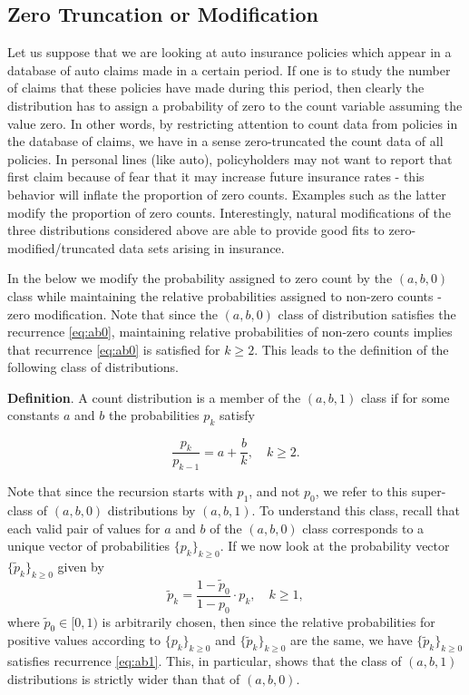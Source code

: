 \documentclass[]{book}
\theoremstyle{definition}
\theoremstyle{definition}
\theoremstyle{definition}
\theoremstyle{remark}
\begin{document}
\subsection{Zero Truncation or
Modification}\label{S:zero-truncation-or-modification}

Let us suppose that we are looking at auto insurance policies which
appear in a database of auto claims made in a certain period. If one is
to study the number of claims that these policies have made during this
period, then clearly the distribution has to assign a probability of
zero to the count variable assuming the value zero. In other words, by
restricting attention to count data from policies in the database of
claims, we have in a sense zero-truncated the count data of all
policies. In personal lines (like auto), policyholders may not want to
report that first claim because of fear that it may increase future
insurance rates - this behavior will inflate the proportion of zero
counts. Examples such as the latter modify the proportion of zero
counts. Interestingly, natural modifications of the three distributions
considered above are able to provide good fits to
zero-modified/truncated data sets arising in insurance.

In the below we modify the probability assigned to zero count by the
\((a,b,0)\) class while maintaining the relative probabilities assigned
to non-zero counts - zero modification. Note that since the \((a,b,0)\)
class of distribution satisfies the recurrence \eqref{eq:ab0}, maintaining
relative probabilities of non-zero counts implies that recurrence
\eqref{eq:ab0} is satisfied for \(k\geq 2\). This leads to the definition
of the following class of distributions.

\textbf{Definition}. A count distribution is a member of the
\((a, b, 1)\) class if for some constants \(a\) and \(b\) the
probabilities \(p_k\) satisfy

\begin{equation}
\frac{p_k}{p_{k-1}}=a+\frac{b}{k},\quad k\geq 2.
\label{eq:ab1}
\end{equation}

Note that since the recursion starts with \(p_1\), and not \(p_0\), we
refer to this super-class of \((a,b,0)\) distributions by \((a,b,1)\).
To understand this class, recall that each valid pair of values for
\(a\) and \(b\) of the \((a,b,0)\) class corresponds to a unique vector
of probabilities \(\{p_k\}_{k\geq 0}\). If we now look at the
probability vector \(\{\tilde{p}_k\}_{k\geq 0}\) given by \[
\tilde{p}_k= \frac{1-\tilde{p}_0}{1-p_0}\cdot p_k, \quad k\geq 1,
\] where \(\tilde{p}_0\in[0,1)\) is arbitrarily chosen, then since the
relative probabilities for positive values according to
\(\{p_k\}_{k\geq 0}\) and \(\{\tilde{p}_k\}_{k\geq 0}\) are the same, we
have \(\{\tilde{p}_k\}_{k\geq 0}\) satisfies recurrence \eqref{eq:ab1}.
This, in particular, shows that the class of \((a,b,1)\) distributions
is strictly wider than that of \((a,b,0)\).
\end{document}
